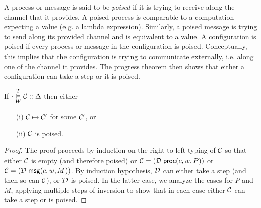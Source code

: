 A process or message is said to be \emph{poised} if it is trying to
receive along the channel that it provides.  A poised process is
comparable to a computation expecting a value (e.g. a lambda expression).
Similarly, a poised message is trying to send along its provided channel and is equivalent to a value.
A configuration is poised if every process or message in the configuration is poised.
Conceptually, this implies that the configuration is trying to communicate
externally, i.e. along one of the channel it provides.
The progress theorem then shows that either a configuration can take a
step or it is poised.

\begin{theorem}
\label{thm:progress}
\mbox{}
If $\cdot \overset{T}{\underset{W}{\vDash}} \mathcal{C} :: \Delta$ then either
\begin{enumerate}
\item[(i)] $\mathcal{C} \mapsto \mathcal{C}'$ for some $\mathcal{C}'$, or
\item[(ii)] $\mathcal{C}$ is poised.
\end{enumerate}
\end{theorem}
\begin{proof}
The proof proceeds by induction on the right-to-left typing of $\mathcal{C}$ so that either
$\mathcal{C}$ is empty (and therefore poised) or
$\mathcal{C} = (\mathcal{D}\; \mathsf{proc}(c, w, P))$ or
$\mathcal{C} = (\mathcal{D}\; \mathsf{msg}(c, w, M))$. By induction hypothesis, $\mathcal{D}$ can
either take a step (and then so can $\mathcal{C}$), or $\mathcal{D}$ is poised.  In
the latter case, we analyze the cases for $P$ and $M$, applying multiple steps of
inversion to show that in each
case either $\mathcal{C}$ can take a step or is poised.
\end{proof}

%


